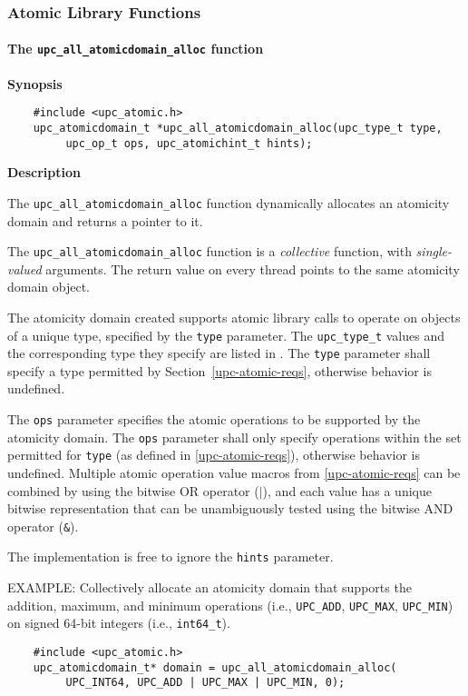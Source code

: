 \newpage
\subsubsection{Atomic Library Functions}
\label{upc-atomic-functions}

\paragraph{The {\tt upc\_all\_atomicdomain\_alloc} function}

{\bf Synopsis}

\npf\vspace{-1.8em}
\begin{verbatim}
    #include <upc_atomic.h>
    upc_atomicdomain_t *upc_all_atomicdomain_alloc(upc_type_t type,
         upc_op_t ops, upc_atomichint_t hints);
\end{verbatim}

{\bf Description}

\np The {\tt upc\_all\_atomicdomain\_alloc} function dynamically allocates an
    atomicity domain and returns a pointer to it.

\np The {\tt upc\_all\_atomicdomain\_alloc} function is a {\em collective} function,
    with {\em single-valued} arguments.
    The return value on every thread points to the same atomicity domain
    object.

\np The atomicity domain created supports atomic library calls to operate on objects of a
    unique type, specified by the {\tt type} parameter.  The {\tt upc\_type\_t}
    values and the corresponding type they specify are listed in
    \upctypesection{}.
    The {\tt type} parameter shall specify a type permitted
    by Section~\ref{upc-atomic-reqs}, otherwise behavior is undefined.

\np The {\tt ops} parameter specifies the atomic operations to be supported by
    the atomicity domain.  The {\tt ops} parameter shall only specify
    operations within the set permitted for {\tt type} (as defined in
    \ref{upc-atomic-reqs}), otherwise behavior is undefined.
    Multiple atomic operation value macros from \ref{upc-atomic-reqs}
    can be combined by using the bitwise OR operator ($|$), and each value has
    a unique bitwise representation that can be unambiguously tested using the
    bitwise AND operator ({\tt \&}).

\np The implementation is free to ignore the {\tt hints} parameter.

\np EXAMPLE: Collectively allocate an atomicity domain that supports the
    addition, maximum, and minimum operations (i.e., {\tt UPC\_ADD},
    {\tt UPC\_MAX}, {\tt UPC\_MIN}) on signed 64-bit integers (i.e.,
    {\tt int64\_t}).
\begin{verbatim}
    #include <upc_atomic.h>
    upc_atomicdomain_t* domain = upc_all_atomicdomain_alloc(
         UPC_INT64, UPC_ADD | UPC_MAX | UPC_MIN, 0);
\end{verbatim}
\vfill

